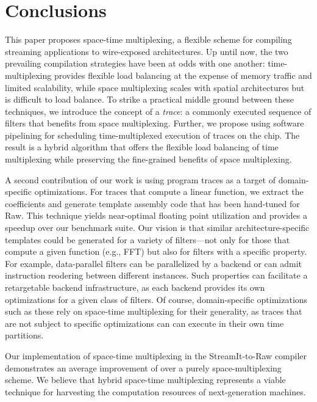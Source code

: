 \section{Conclusions}
\label{sec:conclusion}

This paper proposes space-time multiplexing, a flexible scheme for
compiling streaming applications to wire-exposed architectures.  Up
until now, the two prevailing compilation strategies have been at odds
with one another: time-multiplexing provides flexible load balancing
at the expense of memory traffic and limited scalability, while space
multiplexing scales with spatial architectures but is difficult to
load balance.  To strike a practical middle ground between these
techniques, we introduce the concept of a {\it trace}: a commonly
executed sequence of filters that benefits from space multiplexing.
Further, we propose using software pipelining for scheduling
time-multiplexed execution of traces on the chip.  The result is a
hybrid algorithm that offers the flexible load balancing of time
multiplexing while preserving the fine-grained benefits of space
multiplexing.

A second contribution of our work is using program traces as a target
of domain-specific optimizations.  For traces that compute a linear
function, we extract the coefficients and generate template assembly
code that has been hand-tuned for Raw.  This technique yields
near-optimal floating point utilization and provides a 
speedup over our benchmark suite.  Our vision is that similar
architecture-specific templates could be generated for a variety of
filters---not only for those that compute a given function (e.g., FFT)
but also for filters with a specific property.  For example,
data-parallel filters can be parallelized by a backend or can admit
instruction reodering between different instances.  Such properties
can facilitate a retargetable backend infrastructure, as each backend
provides its own optimizations for a given class of filters.  Of
course, domain-specific optimizations such as these rely on space-time
multiplexing for their generality, as traces that are not subject to
specific optimizations can can execute in their own time partitions.

Our implementation of space-time multiplexing in the StreamIt-to-Raw
compiler demonstrates an average improvement of  over a
purely space-multiplexing scheme.  We believe that hybrid space-time
multiplexing represents a viable technique for harvesting the
computation resources of next-generation machines.
